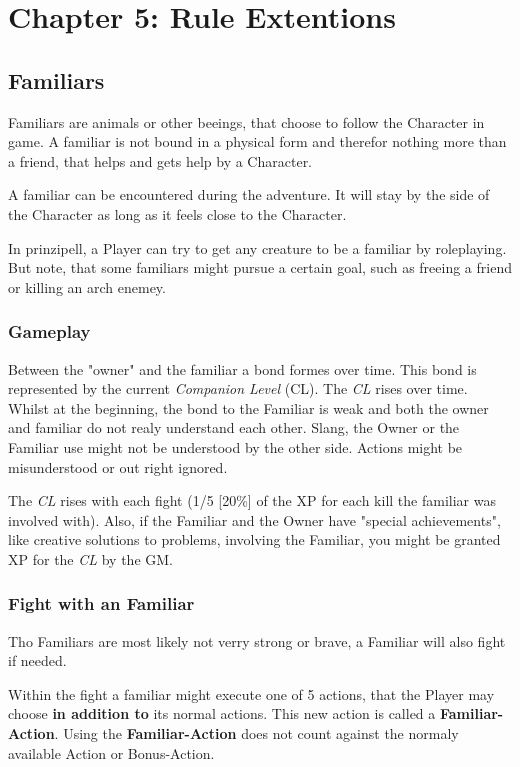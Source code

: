 \chapter{Chapter 5: Rule Extentions}
\section{Familiars}

Familiars are animals or other beeings, that choose to follow the Character in game. A familiar is not bound in a physical form and therefor nothing more than a friend, that helps and gets help by a Character.

A familiar can be encountered during the adventure. It will stay by the side of the Character as long as it feels close to the Character.

In prinzipell, a Player can try to get any creature to be a familiar by roleplaying. But note, that some familiars might pursue a certain goal, such as freeing a friend or killing an arch enemey.

\subsection{Gameplay}

Between the "owner" and the familiar a bond formes over time. This bond is represented by the current \textit{Companion Level} (CL). The \textit{CL} rises over time. Whilst at the beginning, the bond to the Familiar is weak and both the owner and familiar do not realy understand each other. Slang, the Owner or the Familiar use might not be understood by the other side. Actions might be misunderstood or out right ignored.

The \textit{CL} rises with each fight (1/5 [20\%] of the XP for each kill the familiar was involved with). Also, if the Familiar and the Owner have "special achievements", like creative solutions to problems, involving the Familiar, you might be granted XP for the \textit{CL} by the GM.

\subsection{Fight with an Familiar}

Tho Familiars are most likely not verry strong or brave, a Familiar will also fight if needed.

Within the fight a familiar might execute one of 5 actions, that the Player may choose \textbf{in addition to} its normal actions. This new action is called a \textbf{Familiar-Action}.
Using the \textbf{Familiar-Action} does not count against the normaly available Action or Bonus-Action.

